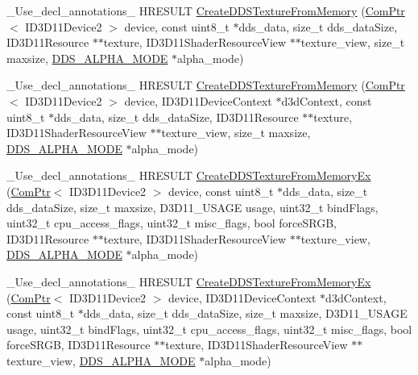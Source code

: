 \begin{DoxyCompactItemize}
\item 
\+\_\+\+Use\+\_\+decl\+\_\+annotations\+\_\+ H\+R\+E\+S\+U\+LT \hyperlink{namespacemage_a2376afff5e5ebcfae1d9af4132bf343e}{Create\+D\+D\+S\+Texture\+From\+Memory} (\hyperlink{namespacemage_ae74f374780900893caa5555d1031fd79}{Com\+Ptr}$<$ I\+D3\+D11\+Device2 $>$ device, const uint8\+\_\+t $\ast$dds\+\_\+data, size\+\_\+t dds\+\_\+data\+Size, I\+D3\+D11\+Resource $\ast$$\ast$texture, I\+D3\+D11\+Shader\+Resource\+View $\ast$$\ast$texture\+\_\+view, size\+\_\+t maxsize, \hyperlink{namespacemage_a0c586a2bad862f4858900ca121ca80c2}{D\+D\+S\+\_\+\+A\+L\+P\+H\+A\+\_\+\+M\+O\+DE} $\ast$alpha\+\_\+mode)
\item 
\+\_\+\+Use\+\_\+decl\+\_\+annotations\+\_\+ H\+R\+E\+S\+U\+LT \hyperlink{namespacemage_adafc0afa58614314add12184fb81740b}{Create\+D\+D\+S\+Texture\+From\+Memory} (\hyperlink{namespacemage_ae74f374780900893caa5555d1031fd79}{Com\+Ptr}$<$ I\+D3\+D11\+Device2 $>$ device, I\+D3\+D11\+Device\+Context $\ast$d3d\+Context, const uint8\+\_\+t $\ast$dds\+\_\+data, size\+\_\+t dds\+\_\+data\+Size, I\+D3\+D11\+Resource $\ast$$\ast$texture, I\+D3\+D11\+Shader\+Resource\+View $\ast$$\ast$texture\+\_\+view, size\+\_\+t maxsize, \hyperlink{namespacemage_a0c586a2bad862f4858900ca121ca80c2}{D\+D\+S\+\_\+\+A\+L\+P\+H\+A\+\_\+\+M\+O\+DE} $\ast$alpha\+\_\+mode)
\item 
\+\_\+\+Use\+\_\+decl\+\_\+annotations\+\_\+ H\+R\+E\+S\+U\+LT \hyperlink{namespacemage_ace206f81b719a0a44e69aa712ebce381}{Create\+D\+D\+S\+Texture\+From\+Memory\+Ex} (\hyperlink{namespacemage_ae74f374780900893caa5555d1031fd79}{Com\+Ptr}$<$ I\+D3\+D11\+Device2 $>$ device, const uint8\+\_\+t $\ast$dds\+\_\+data, size\+\_\+t dds\+\_\+data\+Size, size\+\_\+t maxsize, D3\+D11\+\_\+\+U\+S\+A\+GE usage, uint32\+\_\+t bind\+Flags, uint32\+\_\+t cpu\+\_\+access\+\_\+flags, uint32\+\_\+t misc\+\_\+flags, bool force\+S\+R\+GB, I\+D3\+D11\+Resource $\ast$$\ast$texture, I\+D3\+D11\+Shader\+Resource\+View $\ast$$\ast$texture\+\_\+view, \hyperlink{namespacemage_a0c586a2bad862f4858900ca121ca80c2}{D\+D\+S\+\_\+\+A\+L\+P\+H\+A\+\_\+\+M\+O\+DE} $\ast$alpha\+\_\+mode)
\item 
\+\_\+\+Use\+\_\+decl\+\_\+annotations\+\_\+ H\+R\+E\+S\+U\+LT \hyperlink{namespacemage_a4d8418e49c8d4b5818c1ca7f36bb7a3b}{Create\+D\+D\+S\+Texture\+From\+Memory\+Ex} (\hyperlink{namespacemage_ae74f374780900893caa5555d1031fd79}{Com\+Ptr}$<$ I\+D3\+D11\+Device2 $>$ device, I\+D3\+D11\+Device\+Context $\ast$d3d\+Context, const uint8\+\_\+t $\ast$dds\+\_\+data, size\+\_\+t dds\+\_\+data\+Size, size\+\_\+t maxsize, D3\+D11\+\_\+\+U\+S\+A\+GE usage, uint32\+\_\+t bind\+Flags, uint32\+\_\+t cpu\+\_\+access\+\_\+flags, uint32\+\_\+t misc\+\_\+flags, bool force\+S\+R\+GB, I\+D3\+D11\+Resource $\ast$$\ast$texture, I\+D3\+D11\+Shader\+Resource\+View $\ast$$\ast$texture\+\_\+view, \hyperlink{namespacemage_a0c586a2bad862f4858900ca121ca80c2}{D\+D\+S\+\_\+\+A\+L\+P\+H\+A\+\_\+\+M\+O\+DE} $\ast$alpha\+\_\+mode)

\end{DoxyCompactItemize}
